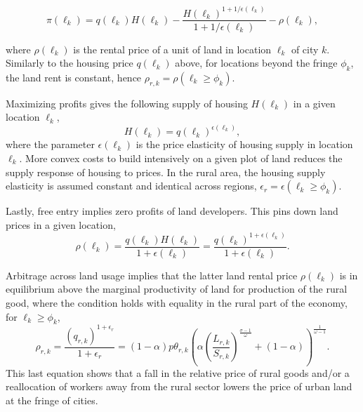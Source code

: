 \documentclass[11pt]{report}
\begin{document}
$$\pi(\ell_k)=q(\ell_k)H(\ell_k)-\frac{H(\ell_k)^{1+1/\epsilon(\ell_k)}}{1+1/\epsilon(\ell_k)}-\rho(\ell_k),$$

where $\rho(\ell_k)$ is the rental price of a unit of land in location $\ell_k$ of city $k$. Similarly to the housing price $q(\ell_k)$ above, for locations beyond the fringe $\phi_k$, the land rent is constant, hence $\rho_{r,k} = \rho(\ell_k \geq \phi_k)$.

Maximizing profits gives the following supply of housing $H(\ell_k)$ in a given location $\ell_k$,
\begin{equation*}
H(\ell_k)=q(\ell_k) ^{\epsilon(\ell_k)}, \label{B-eq:QHsupply2}
\end{equation*}
where the parameter $\epsilon(\ell_k)$ is the price elasticity of housing supply in location  $\ell_k$. More convex costs to build intensively on a given plot of land reduces the supply response of housing to prices. In the rural area, the housing supply elasticity is assumed constant and identical across regions, $\epsilon_r = \epsilon(\ell_k \geq \phi_k)$.

Lastly, free entry implies zero profits of land developers. This pins down land prices in a given location,
\begin{equation*}
\rho(\ell_k)=\frac{q(\ell_k)H(\ell_k)}{1+\epsilon(\ell_k)}=\frac{q(\ell_k)^{1+\epsilon(\ell_k)}}{ 1+\epsilon(\ell_k)}.\label{B-eq:Qq_r_supply2}
\end{equation*}

Arbitrage across land usage implies that the latter land rental price $\rho(\ell_k)$ is in equilibrium above the marginal productivity of land for production of the rural good, where the condition holds with equality in the rural part of the economy, for $\ell_k \geq \phi_k$,
\begin{equation*}
\rho_{r,k}=\frac{\left(q_{r,k}\right)^{1+\epsilon_r}}{ 1+\epsilon_r }=(1-\alpha)p\theta_{r,k}\left(\alpha \left(\frac{L_{r,k}}{S_{r,k}}\right)^{\frac{\sigma-1}{\omega}} +(1-\alpha) \right)^{\frac{1}{\omega-1}}. \label{B-eq:Qq_r_supply22}
\end{equation*}
This last equation shows that a fall in the relative price of rural goods and/or a reallocation of workers away from the rural sector lowers the price of urban land at the fringe of cities.
\end{document}
